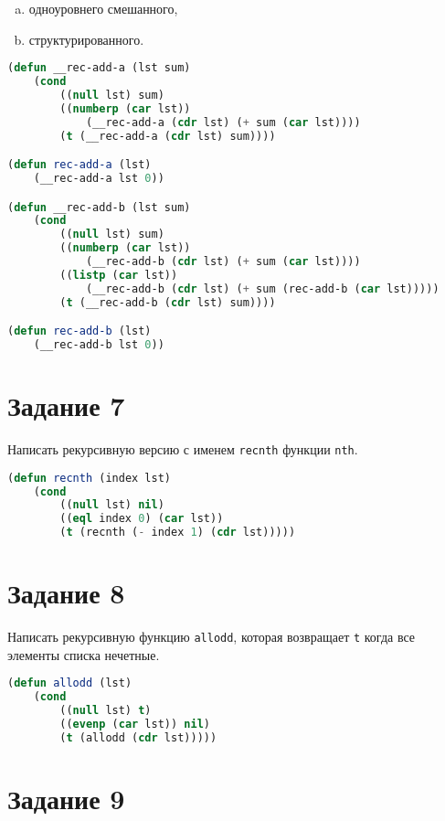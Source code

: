 \begin{enumerate}[a)]
	\item одноуровнего смешанного,
	\item структурированного.
\end{enumerate}

\begin{lstlisting}[language=Lisp]
(defun __rec-add-a (lst sum)
	(cond
		((null lst) sum)
		((numberp (car lst))
			(__rec-add-a (cdr lst) (+ sum (car lst))))
		(t (__rec-add-a (cdr lst) sum))))

(defun rec-add-a (lst)
	(__rec-add-a lst 0))

(defun __rec-add-b (lst sum)
	(cond
		((null lst) sum)
		((numberp (car lst))
			(__rec-add-b (cdr lst) (+ sum (car lst))))
		((listp (car lst))
			(__rec-add-b (cdr lst) (+ sum (rec-add-b (car lst)))))
		(t (__rec-add-b (cdr lst) sum))))

(defun rec-add-b (lst)
	(__rec-add-b lst 0))
\end{lstlisting}

\section{Задание 7}

Написать рекурсивную версию с именем \texttt{recnth} функции \texttt{nth}.

\begin{lstlisting}[language=Lisp]
(defun recnth (index lst)
	(cond
		((null lst) nil)
		((eql index 0) (car lst))
		(t (recnth (- index 1) (cdr lst)))))
\end{lstlisting}

\clearpage

\section{Задание 8}

Написать рекурсивную функцию \texttt{allodd}, которая возвращает \texttt{t} когда все элементы списка
нечетные.

\begin{lstlisting}[language=Lisp]
(defun allodd (lst)
	(cond
		((null lst) t)
		((evenp (car lst)) nil)
		(t (allodd (cdr lst)))))
\end{lstlisting}

\section{Задание 9}

